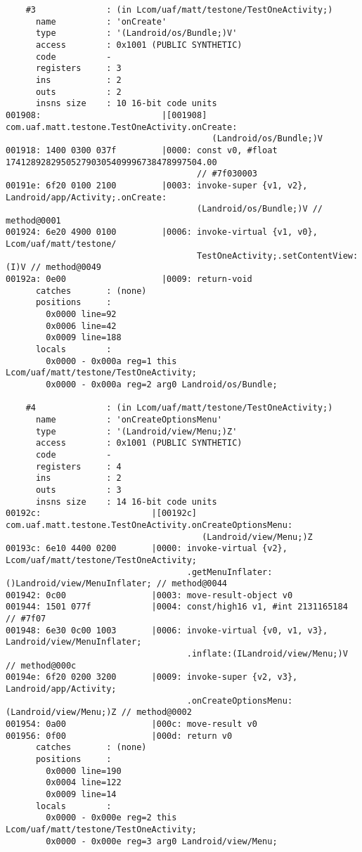 \begin{lstlisting}
    #3              : (in Lcom/uaf/matt/testone/TestOneActivity;)
      name          : 'onCreate'
      type          : '(Landroid/os/Bundle;)V'
      access        : 0x1001 (PUBLIC SYNTHETIC)
      code          -
      registers     : 3
      ins           : 2
      outs          : 2
      insns size    : 10 16-bit code units
001908:                        |[001908] com.uaf.matt.testone.TestOneActivity.onCreate:
                                         (Landroid/os/Bundle;)V
001918: 1400 0300 037f         |0000: const v0, #float 174128928295052790305409996738478997504.00
                                      // #7f030003
00191e: 6f20 0100 2100         |0003: invoke-super {v1, v2}, Landroid/app/Activity;.onCreate:
                                      (Landroid/os/Bundle;)V // method@0001
001924: 6e20 4900 0100         |0006: invoke-virtual {v1, v0}, Lcom/uaf/matt/testone/
                                      TestOneActivity;.setContentView:(I)V // method@0049
00192a: 0e00                   |0009: return-void
      catches       : (none)
      positions     :
        0x0000 line=92
        0x0006 line=42
        0x0009 line=188
      locals        :
        0x0000 - 0x000a reg=1 this Lcom/uaf/matt/testone/TestOneActivity;
        0x0000 - 0x000a reg=2 arg0 Landroid/os/Bundle;

    #4              : (in Lcom/uaf/matt/testone/TestOneActivity;)
      name          : 'onCreateOptionsMenu'
      type          : '(Landroid/view/Menu;)Z'
      access        : 0x1001 (PUBLIC SYNTHETIC)
      code          -
      registers     : 4
      ins           : 2
      outs          : 3
      insns size    : 14 16-bit code units
00192c:                      |[00192c] com.uaf.matt.testone.TestOneActivity.onCreateOptionsMenu:
                                       (Landroid/view/Menu;)Z
00193c: 6e10 4400 0200       |0000: invoke-virtual {v2}, Lcom/uaf/matt/testone/TestOneActivity;
                                    .getMenuInflater:()Landroid/view/MenuInflater; // method@0044
001942: 0c00                 |0003: move-result-object v0
001944: 1501 077f            |0004: const/high16 v1, #int 2131165184 // #7f07
001948: 6e30 0c00 1003       |0006: invoke-virtual {v0, v1, v3}, Landroid/view/MenuInflater;
                                    .inflate:(ILandroid/view/Menu;)V // method@000c
00194e: 6f20 0200 3200       |0009: invoke-super {v2, v3}, Landroid/app/Activity;
                                    .onCreateOptionsMenu:(Landroid/view/Menu;)Z // method@0002
001954: 0a00                 |000c: move-result v0
001956: 0f00                 |000d: return v0
      catches       : (none)
      positions     :
        0x0000 line=190
        0x0004 line=122
        0x0009 line=14
      locals        :
        0x0000 - 0x000e reg=2 this Lcom/uaf/matt/testone/TestOneActivity;
        0x0000 - 0x000e reg=3 arg0 Landroid/view/Menu;


\end{lstlisting}
